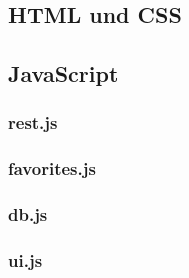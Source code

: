 \subsection{HTML und CSS}

\subsection{JavaScript}
\subsubsection{rest.js}
\subsubsection{favorites.js}
\subsubsection{db.js}
\subsubsection{ui.js}

